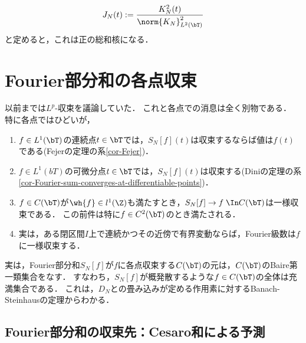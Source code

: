 \documentclass[uplatex,dvipdfmx]{jsreport}
\begin{document}
\begin{proposition}
    \[J_N(t):=\frac{K^2_N(t)}{\norm{K_N}^2_{L^2(\bT)}}\]
    と定めると，これは正の総和核になる．
\end{proposition}

\section{Fourier部分和の各点収束}

\begin{tcolorbox}[colframe=ForestGreen, colback=ForestGreen!10!white,breakable,colbacktitle=ForestGreen!40!white,coltitle=black,fonttitle=\bfseries\sffamily,
title=]
    以前までは$L^p$-収束を議論していた．
    これと各点での消息は全く別物である．
    特に各点ではひどいが，
    \begin{enumerate}
        \item $f\in L^1(\bT)$の連続点$t\in\bT$では，$S_N[f](t)$は収束するならば値は$f(t)$である(Fejerの定理の系\ref{cor-Fejer})．
        \item $f\in L^1(bT)$の可微分点$t\in\bT$では，$S_N[f](t)$は収束する(Diniの定理の系\ref{cor-Fourier-sum-converges-at-differentiable-points})．
        \item $f\in C(\bT)$が$\wh{f}\in l^1(\Z)$も満たすとき，$S_N[f]\to f\;\In C(\bT)$は一様収束である．
        この前件は特に$f\in C^2(\bT)$のとき満たされる．
        \item 実は，ある閉区間$I$上で連続かつその近傍で有界変動ならば，Fourier級数は$f$に一様収束する．
    \end{enumerate}
\end{tcolorbox}

\begin{remarks}
    実は，Fourier部分和$S_N[f]$が$f$に各点収束する$C(\bT)$の元は，$C(\bT)$のBaire第一類集合をなす．
    すなわち，$S_N[f]$が概発散するような$f\in C(\bT)$の全体は充満集合である．
    これは，$D_N$との畳み込みが定める作用素に対するBanach-Steinhausの定理からわかる．
\end{remarks}

\subsection{Fourier部分和の収束先：Cesaro和による予測}
\end{document}
